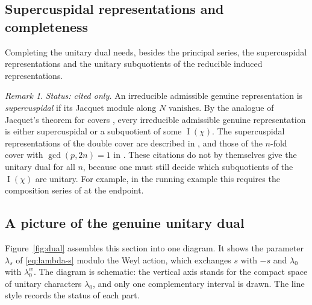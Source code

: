 \documentclass[12pt,letterpaper]{article}
\numberwithin{equation}{section}
\theoremstyle{plain}
\theoremstyle{definition}
\theoremstyle{remark}
\newcounter{uvc}
\newtheorem{uvremark}[uvc]{Remark}
\DeclareMathOperator{\PI}{I}
\begin{document}
\subsection*{Supercuspidal representations and completeness}

Completing the unitary dual needs, besides the principal series, the
supercuspidal representations and the unitary subquotients of the
reducible induced representations.

\begin{uvremark}\label{uv:subquotient}
\emph{Status: cited only.} An irreducible admissible genuine representation is
\emph{supercuspidal} if its Jacquet module along $N$ vanishes. By the
analogue of Jacquet's theorem for covers \cite{BZ77,BD84}, every
irreducible admissible genuine representation is either supercuspidal
or a subquotient of some $\PI(\chi)$. The supercuspidal representations
of the double cover are described in \cite{Ma84a,Ma84b}, and those of
the $n$-fold cover with $\gcd(p,2n)=1$ in \cite{Jo99}. These citations
do not by themselves give the unitary dual for all $n$, because one
must still decide which subquotients of the $\PI(\chi)$ are unitary.
For example, in the running example this requires the composition
series of \cite{Ar80} at the endpoint.
\end{uvremark}

\subsection*{A picture of the genuine unitary dual}

Figure~\ref{fig:dual} assembles this section into one diagram. It shows
the parameter $\lambda_s$ of \eqref{eq:lambda-s} modulo the Weyl
action, which exchanges $s$ with $-s$ and $\lambda_0$ with
$\lambda_0^w$. The diagram is schematic: the vertical axis stands for
the compact space of unitary characters $\lambda_0$, and only one
complementary interval is drawn. The line style records the status of
each part.
\end{document}
